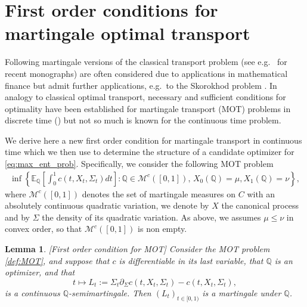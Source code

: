 \documentclass[reqno, a4paper]{amsart}
\newtheorem{lemma}[theorem]{Lemma}
\theoremstyle{remark}
\newcommand{\E}{\mathbb{E}}
\newcommand{\Q}{\mathbb{Q}}
\newcommand{\1}{\mathbbm 1}
\numberwithin{equation}{section}
\numberwithin{theorem}{section}
\newcommand{\MBshort}[1]{\marginpar{\color{purple}{[MB: #1]}}}
\begin{document}

 

\section{First order conditions for martingale optimal transport}

Following \cite{HoNe12, BeHePe12, BoNu13,GaHeTo13}
martingale versions of the classical transport problem (see e.g.\ \cite{Vi03, Vi09, Sa15,FiGl21} for recent monographs) are often considered due to applications in  mathematical finance but admit further applications, e.g.\ to the Skorokhod problem \cite{BeCoHu14, BeNuSt19}. In analogy to classical optimal transport, necessary and sufficient conditions for optimality have been established for martingale transport (MOT) problems in discrete time (\cite{BeJu21, BeNuTo16}) but not so much is known for the continuous time problem. 

We derive here a new first order condition for martingale transport in continuous time which we then use to determine the structure of a candidate optimizer for \eqref{eq:max_ent_prob}. Specifically,  we consider the following MOT problem%
%
\begin{align}\label{def:MOT}
\inf\left\{\E_{\Q}\left[ \int_0^1 c\left(t,X_t, \Sigma_t \right) dt \right ]: \Q\in \mathcal M^c([0,1]),\,X_0(\Q)=\mu, X_1(\Q)=\nu \right\},
\end{align}
where $\mathcal M^c([0,1])$ denotes the set of martingale measures on $C$ with an absolutely continuous quadratic variation,  we  denote by $X$ the canonical process and by $\Sigma$ the density of its quadratic variation. As above, we assumes $\mu\leq\nu$ in convex order, so that  $\mathcal M^c([0,1])$ is non empty.








\begin{lemma}\label{eq:FirstOrderMOT}[First order condition for MOT] 
Consider the MOT problem \eqref{def:MOT}, and suppose that $c$ is differentiable in its last variable, that $\Q$ is an optimizer, and that 
$$t\mapsto L_t:= \Sigma_t\partial_\Sigma c(t,X_t,\Sigma_t)-c(t,X_t,\Sigma_t),$$ is a continuous $\Q$-semimartingale. Then $(L_t)_{t\in[0,1)}$ is a  martingale under $\Q$.
\end{lemma}
\end{document}
